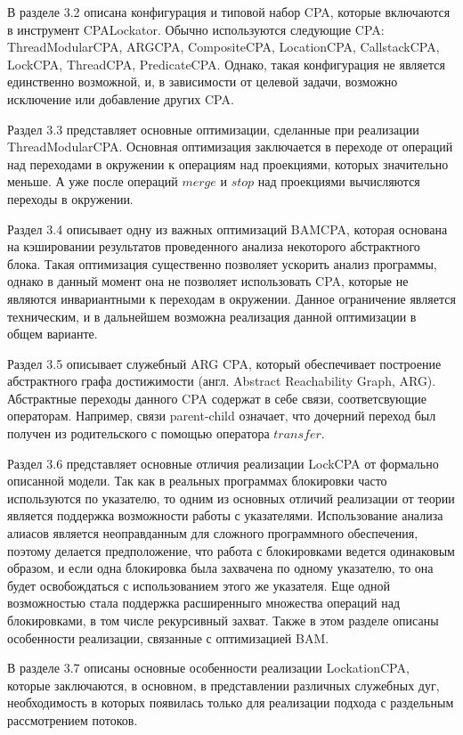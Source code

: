В разделе 3.2 описана конфигурация и типовой набор CPA, которые включаются в инструмент CPALockator.
Обычно используются следующие CPA: ThreadModularCPA, ARGCPA, CompositeCPA, LocationCPA, CallstackCPA, LockCPA, ThreadCPA, PredicateCPA.
Однако, такая конфигурация не является единственно возможной, и, в зависимости от целевой задачи, возможно исключение или добавление других CPA.

Раздел 3.3 представляет основные оптимизации, сделанные при реализации ThreadModularCPA. 
Основная оптимизация заключается в переходе от операций над переходами в окружении к операциям над проекциями, которых значительно меньше.
А уже после операций $merge$ и $stop$ над проекциями вычисляются переходы в окружении.

Раздел 3.4 описывает одну из важных оптимизаций BAMCPA, которая основана на кэшировании результатов проведенного анализа некоторого абстрактного блока.
Такая оптимизация существенно позволяет ускорить анализ программы, однако в данный момент она не позволяет использовать CPA, которые не являются инвариантными к переходам в окружении.
Данное ограничение является техническим, и в дальнейшем возможна реализация данной оптимизации в общем варианте.

Раздел 3.5 описывает служебный ARG CPA, который обеспечивает построение абстрактного графа достижимости (англ. Abstract Reachability Graph, ARG).
Абстрактные переходы данного CPA содержат в себе связи, соответсвующие операторам.
Например, связи parent-child означает, что дочерний переход был получен из родительского с помощью оператора $transfer$.

Раздел 3.6 представляет основные отличия реализации LockCPA от формально описанной модели. 
Так как в реальных программах блокировки часто используются по указателю, то одним из основных отличий реализации от теории является поддержка возможности работы с указателями.
Использование анализа алиасов является неоправданным для сложного программного обеспечения, поэтому делается предположение, что работа с блокировками ведется одинаковым образом, и если одна блокировка была захвачена по одному указателю, то она будет освобождаться с использованием этого же указателя.
Еще одной возможностью стала поддержка расширенныго множества операций над блокировками, в том числе рекурсивный захват.
Также в этом разделе описаны особенности реализации, связанные с оптимизацией BAM.

В разделе 3.7 описаны основные особенности реализации LockationCPA, которые заключаются, в основном, в представлении различных служебных дуг, необходимость в которых появилась только для реализации подхода с раздельным рассмотрением потоков.

